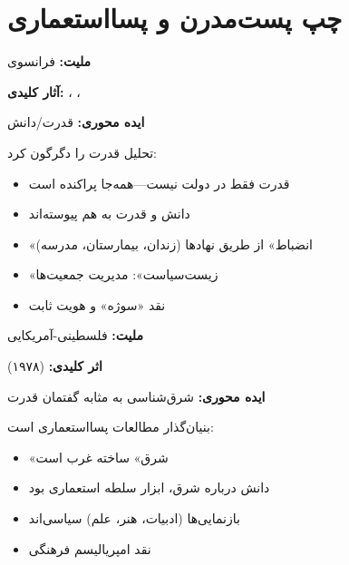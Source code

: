 \section{چپ پست‌مدرن و پسااستعماری}

\begin{personbox}

\textbf{ملیت:} فرانسوی

\textbf{آثار کلیدی:} ، ، 

\textbf{ایده محوری:} قدرت/دانش

\mediumspace

 تحلیل قدرت را دگرگون کرد:
\begin{itemize}[nosep]
    \item قدرت فقط در دولت نیست—همه‌جا پراکنده است
    \item دانش و قدرت به هم پیوسته‌اند
    \item «انضباط» از طریق نهادها (زندان، بیمارستان، مدرسه)
    \item «زیست‌سیاست»: مدیریت جمعیت‌ها
    \item نقد «سوژه» و هویت ثابت
\end{itemize}
\end{personbox}

\begin{personbox}

\textbf{ملیت:} فلسطینی-آمریکایی

\textbf{اثر کلیدی:}  (۱۹۷۸)

\textbf{ایده محوری:} شرق‌شناسی به مثابه گفتمان قدرت

\mediumspace

 بنیان‌گذار مطالعات پسااستعماری است:
\begin{itemize}[nosep]
    \item «شرق» ساخته غرب است
    \item دانش درباره شرق، ابزار سلطه استعماری بود
    \item بازنمایی‌ها (ادبیات، هنر، علم) سیاسی‌اند
    \item نقد امپریالیسم فرهنگی
\end{itemize}
\end{personbox}

